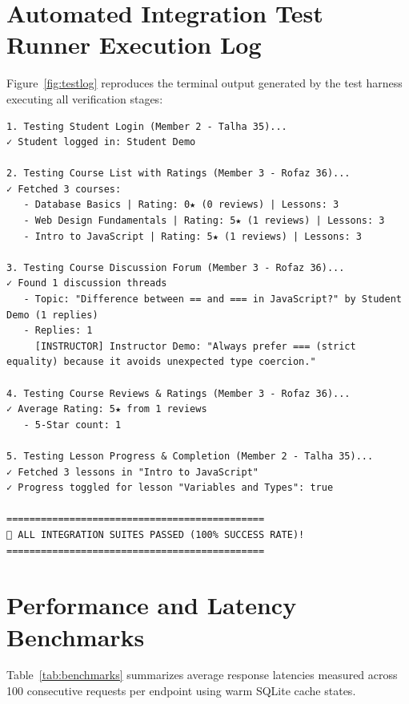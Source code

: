 \documentclass[12pt,a4paper]{report}
\begin{document}
\section{Automated Integration Test Runner Execution Log}
Figure~\ref{fig:testlog} reproduces the terminal output generated by the test harness executing all verification stages:
\begin{lstlisting}[caption={Automated Integration Test Harness Console Output}]
1. Testing Student Login (Member 2 - Talha 35)...
✓ Student logged in: Student Demo

2. Testing Course List with Ratings (Member 3 - Rofaz 36)...
✓ Fetched 3 courses:
   - Database Basics | Rating: 0★ (0 reviews) | Lessons: 3
   - Web Design Fundamentals | Rating: 5★ (1 reviews) | Lessons: 3
   - Intro to JavaScript | Rating: 5★ (1 reviews) | Lessons: 3

3. Testing Course Discussion Forum (Member 3 - Rofaz 36)...
✓ Found 1 discussion threads
   - Topic: "Difference between == and === in JavaScript?" by Student Demo (1 replies)
   - Replies: 1
     [INSTRUCTOR] Instructor Demo: "Always prefer === (strict equality) because it avoids unexpected type coercion."

4. Testing Course Reviews & Ratings (Member 3 - Rofaz 36)...
✓ Average Rating: 5★ from 1 reviews
   - 5-Star count: 1

5. Testing Lesson Progress & Completion (Member 2 - Talha 35)...
✓ Fetched 3 lessons in "Intro to JavaScript"
✓ Progress toggled for lesson "Variables and Types": true

=============================================
🎉 ALL INTEGRATION SUITES PASSED (100% SUCCESS RATE)!
=============================================
\end{lstlisting}

\section{Performance and Latency Benchmarks}
Table~\ref{tab:benchmarks} summarizes average response latencies measured across 100 consecutive requests per endpoint using warm SQLite cache states.
\end{document}
